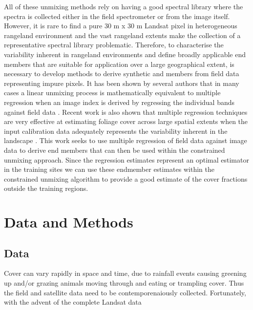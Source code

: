 \documentclass[remotesensing,article,accept,moreauthors,pdftex,12pt,a4paper]{mdpi}
\begin{document}
All of these unmixing methods rely on having a good spectral library where the spectra is collected either in the field spectrometer or from the image itself. However, it is rare to find a pure 30 m x 30 m Landsat pixel in heterogeneous rangeland environment and the vast rangeland extents make the collection of a representative spectral library problematic. Therefore, to characterise the variability inherent in rangeland environments and define broadly applicable end members that are suitable for application over a large geographical extent, is necessary to develop methods to derive synthetic and members from field data representing impure pixels. It has been shown by several authors that in many cases a linear unmixing process is mathematically equivalent to multiple regression when an image index is derived by regressing the individual bands against field data \citep{Puyou-Lascassies1994,Settle1998}. Recent work is also shown that multiple regression techniques are very effective at estimating foliage cover across large spatial extents when the input calibration data adequately represents the variability inherent in the landscape \citep{Armston2009}. This work seeks to use multiple regression of field data against image data to derive end members that can then be used within the constrained unmixing approach. Since the regression estimates represent an optimal estimator in the training sites we can use these endmember estimates within the constrained unmixing algorithm to provide a good estimate of the cover fractions outside the training regions. 





\section{Data and Methods}

\subsection{Data}

Cover can vary rapidly in space and time, due to rainfall events causing greening up and/or grazing animals moving through and eating or trampling cover. Thus the field and satellite data need to be contemporenaiously collected. Fortunately, with the advent of the complete Landsat data
%
%
\end{document}
